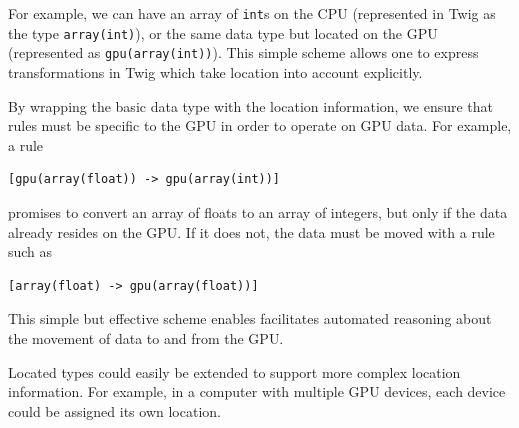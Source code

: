 For example, we can have an array of \texttt{int}s on the CPU (represented in
Twig as the type \texttt{array(int)}), or the same data type but located on the
GPU (represented as \texttt{gpu(array(int))}). This simple scheme allows one to
express transformations in Twig which take location into account explicitly.

By wrapping the basic data type with the location information, we ensure that
rules must be specific to the GPU in order to operate on GPU data. For example,
a rule

\begin{verbatim}
[gpu(array(float)) -> gpu(array(int))]
\end{verbatim}

promises to convert an array of floats to an array of integers, but only if the
data already resides on the GPU. If it does not, the data must be moved with a
rule such as

\begin{verbatim}
[array(float) -> gpu(array(float))]
\end{verbatim}

This simple but effective scheme enables facilitates automated reasoning about
the movement of data to and from the GPU.

Located types could easily be extended to support more complex location
information. For example, in a computer with multiple GPU devices, each device
could be assigned its own location.
